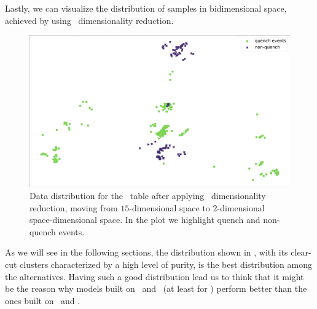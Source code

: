 Lastly, we can visualize the distribution of samples in bidimensional space, achieved by using \pca\
dimensionality reduction.
\begin{figure}[!ht]
	\centering
	\includegraphics[width=\linewidth]{img/An_distribution.png}
	\caption{Data distribution for the \an\ table after applying \pca\ dimensionality
		reduction, moving from $15$-dimensional space to $2$-dimensional space-dimensional
		space. In the plot we highlight quench and non-quench events.} \label{fig:an-dist}
\end{figure}

As we will see in the following sections, the distribution shown in , with its
clear-cut clusters characterized by a high level of purity, is the best distribution among the
alternatives. Having such a good distribution lead us to think that it might be the reason why
models built on \an\ and \cnmod\ (at least for \qrp) perform better than the ones built on \bn\ and
\phin.

